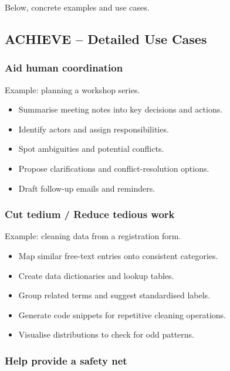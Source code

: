 \documentclass[
  letterpaper,
  DIV=11,
  numbers=noendperiod]{scrreprt}
\providecommand{\tightlist}{%
  \setlength{\itemsep}{0pt}\setlength{\parskip}{0pt}}
\begin{document}
Below, concrete examples and use cases.

\subsection{ACHIEVE -- Detailed Use
Cases}\label{achieve-detailed-use-cases}

\subsubsection{Aid human coordination}\label{aid-human-coordination}

Example: planning a workshop series.

\begin{itemize}
\tightlist
\item
  Summarise meeting notes into key decisions and actions.
\item
  Identify actors and assign responsibilities.
\item
  Spot ambiguities and potential conflicts.
\item
  Propose clarifications and conflict-resolution options.
\item
  Draft follow-up emails and reminders.
\end{itemize}

\subsubsection{Cut tedium / Reduce tedious
work}\label{cut-tedium-reduce-tedious-work}

Example: cleaning data from a registration form.

\begin{itemize}
\tightlist
\item
  Map similar free-text entries onto consistent categories.
\item
  Create data dictionaries and lookup tables.
\item
  Group related terms and suggest standardised labels.
\item
  Generate code snippets for repetitive cleaning operations.
\item
  Visualise distributions to check for odd patterns.
\end{itemize}

\subsubsection{Help provide a safety
net}\label{help-provide-a-safety-net}
\end{document}
